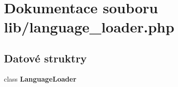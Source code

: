 \section{Dokumentace souboru lib/language\_\-loader.php}
\label{dd/dee/language__loader_8php}
\subsection*{Datové struktry}
\begin{DoxyCompactItemize}
\item 
class {\bf LanguageLoader}
\end{DoxyCompactItemize}
